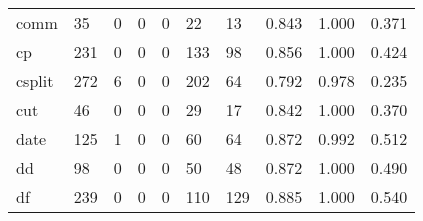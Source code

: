 \begin{longtable}{lp{1.3cm}p{1.3cm}p{1.3cm}p{1.3cm}p{1.3cm}p{1.3cm}p{1.3cm}p{1.3cm}p{1.3cm}}
comm      &                     35 &                                             0 &                                            0 &                                           0 &                                           22 &                                         13 &                                0.843 &                                  1.000 &                                0.371 \\
cp        &                    231 &                                             0 &                                            0 &                                           0 &                                          133 &                                         98 &                                0.856 &                                  1.000 &                                0.424 \\
csplit    &                    272 &                                             6 &                                            0 &                                           0 &                                          202 &                                         64 &                                0.792 &                                  0.978 &                                0.235 \\
cut       &                     46 &                                             0 &                                            0 &                                           0 &                                           29 &                                         17 &                                0.842 &                                  1.000 &                                0.370 \\
date      &                    125 &                                             1 &                                            0 &                                           0 &                                           60 &                                         64 &                                0.872 &                                  0.992 &                                0.512 \\
dd        &                     98 &                                             0 &                                            0 &                                           0 &                                           50 &                                         48 &                                0.872 &                                  1.000 &                                0.490 \\
df        &                    239 &                                             0 &                                            0 &                                           0 &                                          110 &                                        129 &                                0.885 &                                  1.000 &                                0.540 \\

\end{longtable}
